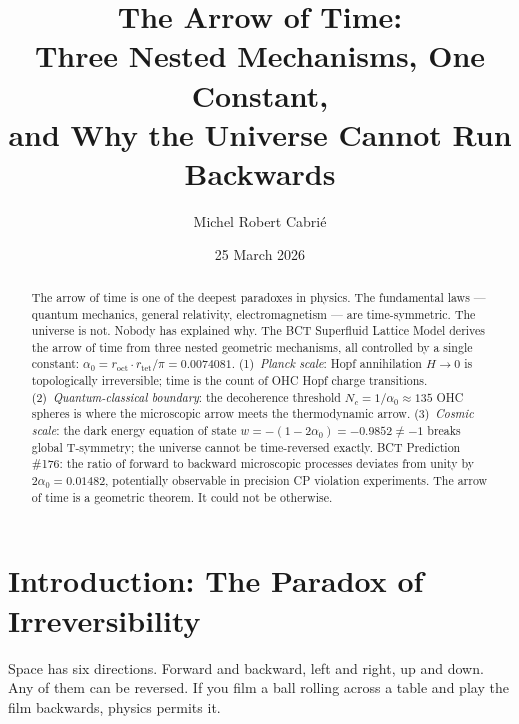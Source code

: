 \documentclass[aps,prl,twocolumn,superscriptaddress,floatfix]{revtex4-2}
\newcommand{\roct}{r_{\mathrm{oct}}}
\newcommand{\rtet}{r_{\mathrm{tet}}}
\newcommand{\azero}{\alpha_0}
\newcommand{\Nc}{N_c}
\begin{document}

\title{The Arrow of Time:\\
Three Nested Mechanisms, One Constant,\\
and Why the Universe Cannot Run Backwards}

\author{Michel Robert Cabri\'e}

\date{25 March 2026}

\begin{abstract}
The arrow of time is one of the deepest paradoxes in physics. 
The fundamental laws --- quantum mechanics, general relativity, 
electromagnetism --- are time-symmetric. The universe is not. 
Nobody has explained why. The BCT Superfluid Lattice Model 
derives the arrow of time from three nested geometric mechanisms, 
all controlled by a single constant: $\azero = \roct \cdot 
\rtet / \pi = 0.0074081$. 
(1)~\textit{Planck scale}: Hopf annihilation $H \to 0$ is 
topologically irreversible; time is the count of OHC Hopf 
charge transitions. 
(2)~\textit{Quantum-classical boundary}: the decoherence 
threshold $\Nc = 1/\azero \approx 135$ OHC spheres is where 
the microscopic arrow meets the thermodynamic arrow. 
(3)~\textit{Cosmic scale}: the dark energy equation of state 
$w = -(1-2\azero) = -0.9852 \neq -1$ breaks global T-symmetry; 
the universe cannot be time-reversed exactly. 
BCT Prediction \#176: the ratio of forward to backward 
microscopic processes deviates from unity by $2\azero = 0.01482$, 
potentially observable in precision CP violation experiments. 
The arrow of time is a geometric theorem. It could not be otherwise.
\end{abstract}

\maketitle

\section{Introduction: The Paradox of Irreversibility}

Space has six directions. Forward and backward, left and right, 
up and down. Any of them can be reversed. If you film a ball 
rolling across a table and play the film backwards, physics 
permits it.
\end{document}

